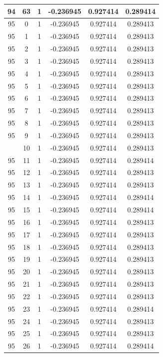 \documentclass[12pt,a4paper]{article}
\numberwithin{equation}{section}
\numberwithin{figure}{section}
\numberwithin{table}{section}
\begin{document}
\begin{longtable}{|c|c|c|c|c|c|}
94 & 63 & 1 & -0.236945 & 0.927414 & 0.289414 \\ \hline
95 & 0 & 1 & -0.236945 & 0.927414 & 0.289413 \\ \hline
95 & 1 & 1 & -0.236945 & 0.927414 & 0.289413 \\ \hline
95 & 2 & 1 & -0.236945 & 0.927414 & 0.289413 \\ \hline
95 & 3 & 1 & -0.236945 & 0.927414 & 0.289413 \\ \hline
95 & 4 & 1 & -0.236945 & 0.927414 & 0.289413 \\ \hline
95 & 5 & 1 & -0.236945 & 0.927414 & 0.289413 \\ \hline
95 & 6 & 1 & -0.236945 & 0.927414 & 0.289413 \\ \hline
95 & 7 & 1 & -0.236945 & 0.927414 & 0.289413 \\ \hline
95 & 8 & 1 & -0.236945 & 0.927414 & 0.289413 \\ \hline
95 & 9 & 1 & -0.236945 & 0.927414 & 0.289413 \\ \hline
\pagebreak
95 & 10 & 1 & -0.236945 & 0.927414 & 0.289413 \\ \hline
95 & 11 & 1 & -0.236945 & 0.927414 & 0.289414 \\ \hline
95 & 12 & 1 & -0.236945 & 0.927414 & 0.289413 \\ \hline
95 & 13 & 1 & -0.236945 & 0.927414 & 0.289413 \\ \hline
95 & 14 & 1 & -0.236945 & 0.927414 & 0.289414 \\ \hline
95 & 15 & 1 & -0.236945 & 0.927414 & 0.289414 \\ \hline
95 & 16 & 1 & -0.236945 & 0.927414 & 0.289413 \\ \hline
95 & 17 & 1 & -0.236945 & 0.927414 & 0.289413 \\ \hline
95 & 18 & 1 & -0.236945 & 0.927414 & 0.289413 \\ \hline
95 & 19 & 1 & -0.236945 & 0.927414 & 0.289413 \\ \hline
95 & 20 & 1 & -0.236945 & 0.927414 & 0.289413 \\ \hline
95 & 21 & 1 & -0.236945 & 0.927414 & 0.289413 \\ \hline
95 & 22 & 1 & -0.236945 & 0.927414 & 0.289413 \\ \hline
95 & 23 & 1 & -0.236945 & 0.927414 & 0.289414 \\ \hline
95 & 24 & 1 & -0.236945 & 0.927414 & 0.289413 \\ \hline
95 & 25 & 1 & -0.236945 & 0.927414 & 0.289413 \\ \hline
95 & 26 & 1 & -0.236945 & 0.927414 & 0.289414 \\ \hline

\end{longtable}
\end{document}
